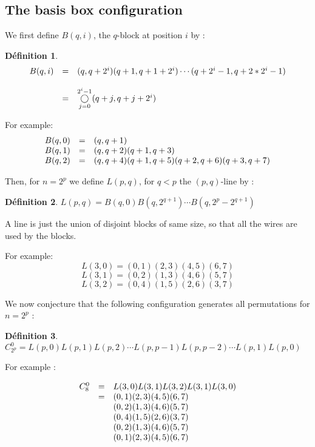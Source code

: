 \documentclass[11pt, a4paper]{article}
\newtheorem*{def*}{Définition}
\begin{document}
\subsection{The basis box configuration}

We first define $B(q,i)$, the $q$-block at position $i$ by :

\begin{def*}
$$\begin{array}{l l l}
	B(q,i) & = & (q,q+2^i)(q+1,q+1+2^i)\cdots(q+2^i-1,q+2*2^i-1) \\ & & \\
		   & = & \overset{2^{i}-1}{\underset{j=0}{\bigcirc}} (q+j,q+j+2^i)
	\end{array}$$
\end{def*}

For example: 
$$\begin{array}{l l l}
	B(q,0) &=& (q,q+1) \\
	B(q,1) &=& (q, q+2)(q+1, q+3) \\
	B(q,2) &=& (q,q+4)(q+1,q+5)(q+2,q+6)(q+3,q+7)
\end{array}$$

Then, for $n=2^p$ we define $L(p,q)$, for $q < p$ the $(p,q)$-line by :

\begin{def*}
$L(p,q) = B(q,0) B(q,2^{q+1}) \cdots B(q,2^p-2^{q+1})$
\end{def*}

A line is just the union of disjoint blocks of same size, so that all the wires are used by the blocks. 

For example:
$$L(3,0) = (0,1)(2,3)(4,5)(6,7)$$
$$L(3,1) = (0,2)(1,3)(4,6)(5,7)$$
$$L(3,2) = (0,4)(1,5)(2,6)(3,7)$$

We now conjecture that the following configuration generates all permutations
for $n=2^p$ :

\begin{def*}
$C_{2^p}^0 = L(p,0) L(p,1) L(p,2) \cdots L(p,p-1) L(p,p-2) \cdots L(p,1) L(p,0)$
\end{def*}

For example :

$$
\begin{array}{l l l}
    C_8^0 & = & L(3,0) L(3,1) L(3,2) L(3,1) L(3,0) \\
        & = & (0,1)(2,3)(4,5)(6,7) \\
        & & (0,2)(1,3)(4,6)(5,7) \\
        & & (0,4)(1,5)(2,6)(3,7) \\
        & & (0,2)(1,3)(4,6)(5,7) \\
        & & (0,1)(2,3)(4,5)(6,7)
\end{array}$$
\end{document}
